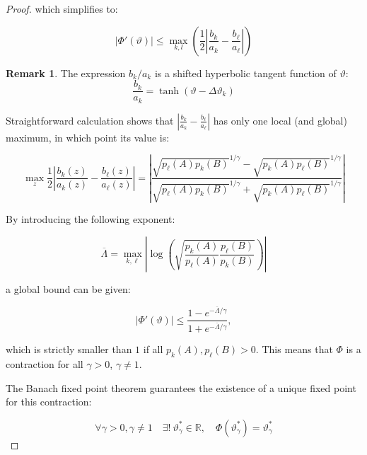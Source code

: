 \documentclass{article}
\theoremstyle{definition}
\newtheorem*{remark}{Remark}
\begin{document}
\begin{proof}
which simplifies to:

\begin{equation}
    |\Phi'(\vartheta)| \le 
    \max_{k,l} \left ( \frac{1}{2} \left | \frac{b_k}{a_k} - \frac{b_\ell}{a_\ell} \right | \right )
\end{equation}



\begin{remark}
    The expression $b_k/a_k$ is a shifted hyperbolic tangent function of $\vartheta$:
    \begin{equation}
        \frac{b_k}{a_k} = \tanh(\vartheta - \Delta \vartheta_k)
    \end{equation}
\end{remark}

Straightforward calculation shows that $\left | \frac{b_k}{a_k} - \frac{b_\ell}{a_\ell} \right |$ has only one local (and global) maximum, in which point its value is:

\begin{equation}
    \max_z  \frac{1}{2} \left | \frac{b_k(z)}{a_k(z)} - \frac{b_\ell(z)}{a_\ell(z)} \right | =
    \left |
    \frac{\sqrt{p_\ell(A) p_k(B)}^{1/\gamma} - \sqrt{p_k(A) p_\ell(B)}^{1/\gamma}}
    {\sqrt{p_\ell(A) p_k(B)}^{1/\gamma} + \sqrt{p_k(A) p_\ell(B)}^{1/\gamma}}
    \right |
\end{equation}

By introducing the following exponent:

\begin{equation}
\label{eq:OverlineLambdaDefinition}
    \overline{\Lambda} = \max_{k,\ell}
    \left |
    \log \left ( \sqrt{\frac{p_k(A)}{p_\ell(A)} \frac{p_\ell(B)}{p_k(B)}} \right )
    \right |
\end{equation}

a global bound can be given:

\begin{equation}
\label{eq:GlobalBoundPhi}
    |\Phi'(\vartheta)| \le 
    \frac{1-e^{-\overline{\Lambda}/\gamma}}{1+e^{-\overline{\Lambda}/\gamma}}
    ,
\end{equation}

which is strictly smaller than $1$ if all $p_k(A),p_\ell(B)>0$.
This means that $\Phi$ is a contraction for all $\gamma > 0$, $\gamma \ne 1$.

The Banach fixed point theorem \cite{book:BanachFixedPoint} guarantees the existence of a unique fixed point for this contraction:

\begin{equation}
    \forall \gamma > 0, \gamma \ne 1 \quad \exists! \ \vartheta^*_\gamma \in \mathbb{R}, \quad \Phi(\vartheta^*_\gamma) = \vartheta^*_\gamma
\end{equation}

\end{proof}
\end{document}
